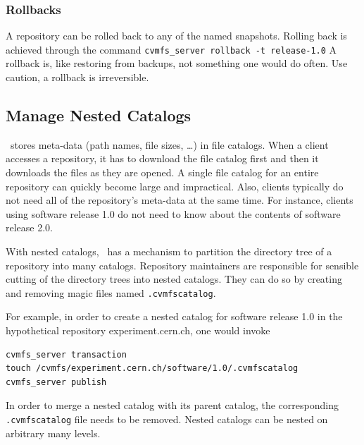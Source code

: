 \subsubsection{Rollbacks}
A repository can be rolled back to any of the named snapshots.
Rolling back is achieved through the command \texttt{cvmfs\_server rollback -t release-1.0}
A rollback is, like restoring from backups, not something one would do often.
Use caution, a rollback is irreversible.

\subsection{Manage Nested Catalogs}
\label{sct:nestedcatalogs}

\cvmfs\ stores meta-data (path names, file sizes, \dots) in file catalogs.
When a client accesses a repository, it has to download the file catalog first and then it downloads the files as they are opened.
A single file catalog for an entire repository can quickly become large and impractical.
Also, clients typically do not need all of the repository's meta-data at the same time.
For instance, clients using software release 1.0 do not need to know about the contents of software release 2.0.

With nested catalogs, \cvmfs\ has a mechanism to partition the directory tree of a repository into many catalogs.
Repository maintainers are responsible for sensible cutting of the directory trees into nested catalogs.
They can do so by creating and removing magic files named \texttt{.cvmfscatalog}.

For example, in order to create a nested catalog for software release 1.0 in the hypothetical repository experiment.cern.ch, one would invoke
\begin{verbatim}
cvmfs_server transaction
touch /cvmfs/experiment.cern.ch/software/1.0/.cvmfscatalog
cvmfs_server publish
\end{verbatim}

In order to merge a nested catalog with its parent catalog, the corresponding \texttt{.cvmfscatalog} file needs to be removed.
Nested catalogs can be nested on arbitrary many levels.

